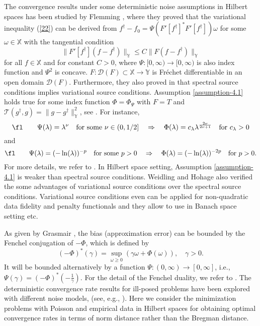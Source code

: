 \documentclass[10pt]{iopart}
\begin{document}
The convergence results under some deterministic noise assumptions in Hilbert spaces has been studied by Flemming \cite{Flemming2011, 
FlemmingHofmannn2011}, where they proved that the variational inequality (\ref{22}) can be derived from $f^{\dagger}-f_{0}=\Psi(F'[f^{\dagger}]^{*}
F'[f^{\dagger}])\omega$ for some $\omega\in\mathbb{X}$ with the tangential condition 
\begin{equation*}
\|F'[f^{\dagger}](f-f^{\dagger})\|_{\mathbb{Y}}\leq C\|F(f-f^{\dagger})\|_{\mathbb{Y}}
\end{equation*}
for all $f\in\mathbb{X}$ and for constant $C>0$, where $\Psi: [0, \infty)\rightarrow [0, \infty)$ is also index function and $\Psi^{2}$ is concave.
$F: \mathcal{D}(F)\subset\mathbb{X}\rightarrow \mathbb{Y}$ is Fr\'{e}chet differentiable in an open domain $\mathcal{D}(F)$.
Furthermore, they also proved in \cite{Flemming2012} that spectral source conditions implies variational source
conditions. Assumption \ref{assumption-4.1} holds true for some index function $\Phi=\Phi_{\Psi}$ with $F=T$ and $\mathcal{T}(g^{\dagger}, g)
=\|g-g^{\dagger}\|_{\mathbb{Y}}^{2}$, see \cite{Flemming2011, FlemmingHofmannn2011}. For instance, 
\begin{equation*}
\fl \qquad\Psi(\lambda)=\lambda^{\nu} \quad\text{for some}~ \nu\in(0, 1/2] \quad \Rightarrow \quad
\Phi(\lambda)=c_{\lambda}\lambda^{\frac{2\nu}{2\nu+1}} \quad \text{for}~c_{\lambda}>0
\end{equation*}
and 
\begin{equation*}
\fl \qquad\Psi(\lambda)=(-\ln(\lambda))^{-p} \quad\text{for some}~ p>0 \quad \Rightarrow \quad
\Phi(\lambda)=(-\ln(\lambda))^{-2p}\quad \text{for}~ p>0.
\end{equation*}
For more details, we refer to  \cite{Flemming2011}. In Hilbert space setting, Assumption
\ref{assumption-4.1} is weaker than spectral source conditions. Weidling and Hohage \cite{Hohage2017} also 
verified the some advantages of variational source conditions over the spectral source conditions. Variational source conditions even can be applied
for non-quadratic data fidelity and penalty functionals and they allow to use in Banach space setting etc. 

As given by Grasmair \cite{Grasmair2010}, the bias (approximation error) can be bounded by the Fenchel conjugation of 
$-\Phi$, which is defined by
\begin{equation}\label{23}
(-\Phi)^{*}(\gamma)=\sup_{\omega\geq 0}(\gamma\omega+\Phi(\omega)), \quad \gamma>0.
\end{equation}
It will be bounded alternatively by a function $\Psi: (0, \infty)\rightarrow [0, \infty]$, i.e., $\Psi(\gamma)=
(-\Phi)^{*}(-\frac{1}{\gamma})$. For the detail of the Fenchel duality, we refer to \cite{Ekeland1999}. The deterministic convergence rate
results for ill-posed problems have been explored with different noise models, (see, e.g., \cite{Flemming2012, Flemming2011, Hohage2014, Hohage2016,
Werner2012}). Here we consider the minimization problems with Poisson and empirical data in Hilbert spaces for obtaining optimal convergence 
rates in terms of norm distance rather than the Bregman distance. 
\end{document}
